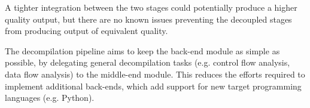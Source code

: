A tighter integration between the two stages could potentially produce a higher quality output, but there are no known issues preventing the decoupled stages from producing output of equivalent quality.

The decompilation pipeline aims to keep the back-end module as simple as possible, by delegating general decompilation tasks (e.g. control flow analysis, data flow analysis) to the middle-end module. This reduces the efforts required to implement additional back-ends, which add support for new target programming languages (e.g. Python).




